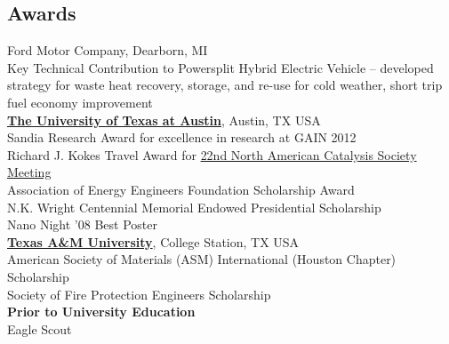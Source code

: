 \documentclass[centered]{res}
\begin{document}
\begin{resume}
\section{Awards}
% 
Ford Motor Company, Dearborn, MI \\
Key Technical Contribution to Powersplit Hybrid Electric Vehicle --
developed strategy for waste heat recovery, storage, and
re-use for cold weather, short trip fuel economy improvement \vspace{5pt} \\ 
%
\href{http://www.utexas.edu/}{\textbf{The University of
    Texas at Austin}}, Austin, TX USA \\
Sandia Research Award for excellence in research at GAIN 2012 \\
Richard J. Kokes Travel Award for \href{http://www.22nam.org/}{22nd
  North American Catalysis Society
  Meeting} \\
Association of Energy Engineers Foundation Scholarship Award \\
N.K. Wright Centennial Memorial Endowed Presidential Scholarship \\
Nano Night '08 Best Poster \vspace{5pt} \\
%
\href{http://www.tamu.edu/}{\textbf{Texas A\&M University}}, College
Station, TX USA \\
American Society of Materials (ASM) International (Houston Chapter)
Scholarship \\
Society of Fire Protection Engineers Scholarship \vspace{5pt} \\
%
\textbf{Prior to University Education} \\
Eagle Scout


\end{resume}
\end{document}
